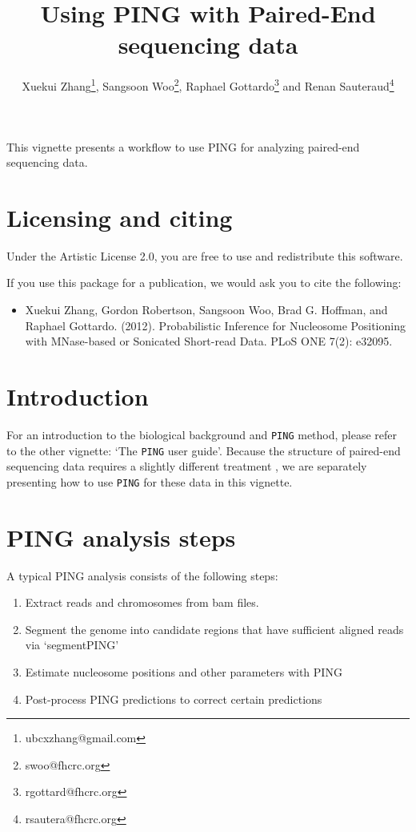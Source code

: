 \documentclass[11pt]{article}
\title{Using PING with Paired-End sequencing data}
\author{Xuekui Zhang\footnote{ubcxzhang@gmail.com}, Sangsoon
Woo\footnote{swoo@fhcrc.org}, Raphael Gottardo\footnote{rgottard@fhcrc.org} and
Renan Sauteraud\footnote{rsautera@fhcrc.org}}
\begin{document}
\maketitle



\textnormal {\normalfont}
This vignette presents a workflow to use PING for analyzing paired-end sequencing data.

\tableofcontents
\newpage


\section{Licensing and citing}

Under the Artistic License 2.0, you are free to use and redistribute this software. 

If you use this package for a publication, we would ask you to cite the following: 

\begin{itemize}
\item[] Xuekui Zhang, Gordon Robertson, Sangsoon Woo, Brad G. Hoffman, and Raphael Gottardo. (2012). Probabilistic Inference for Nucleosome Positioning with MNase-based or Sonicated Short-read Data. PLoS ONE 7(2): e32095.
\end{itemize}


\section{Introduction}
For an introduction to the biological background and \texttt{PING} method, please refer to the other vignette: `The \texttt{PING} user guide'. Because the structure of paired-end sequencing data requires a slightly different treatment , we are separately presenting how to use \texttt{PING} for these data in this vignette. 


\section{PING analysis steps}
A typical PING analysis consists of the following steps:
\begin{enumerate}
  \item Extract reads and chromosomes from bam files.
  \item Segment the genome into candidate regions that have sufficient aligned reads via `segmentPING'
  \item Estimate nucleosome positions and other parameters with PING
  \item Post-process PING predictions to correct certain predictions
\end{enumerate}
\end{document}
